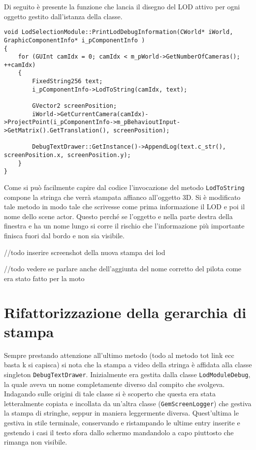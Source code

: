 Di seguito è presente la funzione che lancia il disegno del LOD attivo per ogni oggetto gestito dall'istanza della classe.\\

\begin{lstlisting}[style=maurizio-code]
void LodSelectionModule::PrintLodDebugInformation(CWorld* iWorld, GraphicComponentInfo* i_pComponentInfo )
{
	for (GUInt camIdx = 0; camIdx < m_pWorld->GetNumberOfCameras(); ++camIdx)
	{
		FixedString256 text;
		i_pComponentInfo->LodToString(camIdx, text);
		
		GVector2 screenPosition;
		iWorld->GetCurrentCamera(camIdx)->ProjectPoint(i_pComponentInfo->m_pBehavioutInput->GetMatrix().GetTranslation(), screenPosition);
		
		DebugTextDrawer::GetInstance()->AppendLog(text.c_str(), screenPosition.x, screenPosition.y);
	}
}
\end{lstlisting}

Come si può facilmente capire dal codice l'invocazione del metodo \texttt{LodToString} compone la stringa che verrà stampata affianco all'oggetto 3D. Si è modificato tale metodo in modo tale che scrivesse come prima informazione il LOD e poi il nome dello scene actor. Questo perché se l'oggetto e nella parte destra della finestra e ha un nome lungo si corre il rischio che l'informazione più importante finisca fuori dal bordo e non sia visibile.

//todo inserire screenshot della nuova stampa dei lod

//todo vedere se parlare anche dell'aggiunta del nome corretto del pilota come era stato fatto per la moto

\section{Rifattorizzazione della gerarchia di stampa}

Sempre prestando attenzione all'ultimo metodo (todo al metodo tot link ecc basta k si capisca) si nota che la stampa a video della stringa è affidata alla classe singleton \texttt{DebugTextDrawer}. Inizialmente era gestita dalla classe \texttt{LodModuleDebug}, la quale aveva un nome completamente diverso dal compito che svolgeva. Indagando sulle origini di tale classe si è scoperto che questa era stata letteralmente copiata e incollata da un'altra classe (\texttt{GemScreenLogger}) che gestiva la stampa di stringhe, seppur in maniera leggermente diversa. Quest'ultima le gestiva in stile terminale, conservando e ristampando le ultime entry inserite e gestendo i casi il testo sfora dallo schermo mandandolo a capo piuttosto che rimanga non visibile.\\

